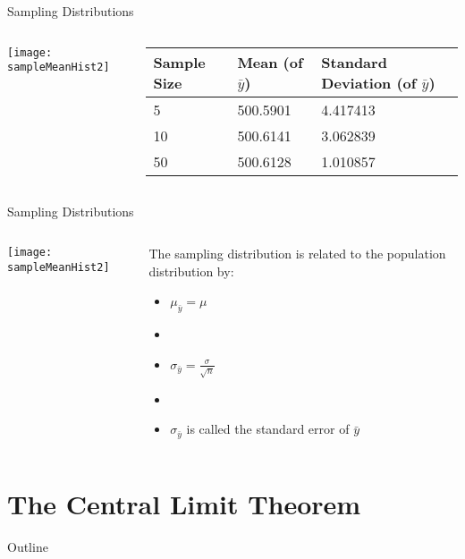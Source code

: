 \documentclass[xcolor=dvipsnames]{beamer}
\begin{document}
\begin{frame}{Sampling Distributions}
	\begin{columns}
		\begin{column}{.5 \textwidth}
			\begin{center}
				\texttt{[image: sampleMeanHist2]}
			\end{center}
		\end{column}
		\begin{column}{.5 \textwidth}
			\begin{tabular}{|p{1.25cm}|p{1.7cm}|p{1.75cm}|} \hline
				\textbf{Sample Size}   &  \textbf{Mean (of $\bar{y}$)}  &  \textbf{Standard Deviation (of $\bar{y}$)} \\ \hline \hline
				5 &500.5901& 4.417413 \\ \hline
				10 &500.6141& 3.062839 \\ \hline
				50& 500.6128 &1.010857 \\ \hline
			\end{tabular}
		\end{column}
	\end{columns}
\end{frame}

\begin{frame}{Sampling Distributions}
	\begin{columns}
		\begin{column}{.5 \textwidth}
			\begin{center}
				\texttt{[image: sampleMeanHist2]}
			\end{center}
		\end{column}
		\begin{column}{.5 \textwidth}
			The sampling distribution is related to the population distribution by: \pause 
			\begin{itemize}
				\item $\mu_{\bar{y}} = \mu$ \pause 
				\item[]
				\item $\sigma_{\bar{y}} =\frac{\sigma}{\sqrt{n}} $\pause 
				\item[]
				\item $\sigma_{\bar{y}}$ is called the standard error of $\bar{y}$
			\end{itemize}
		\end{column}
	\end{columns}
\end{frame}

\section{The Central Limit Theorem}
\begin{frame}{Outline}
	\tableofcontents[currentsection,subsectionstyle=show/shaded/hide]
\end{frame}
\end{document}
